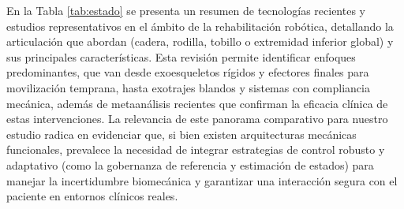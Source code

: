 \documentclass[a4paper,12pt]{article}
\begin{document}
En la Tabla \ref{tab:estado} se presenta un resumen de tecnologías recientes y estudios representativos en el ámbito de la rehabilitación robótica, detallando la articulación que abordan (cadera, rodilla, tobillo o extremidad inferior global) y sus principales características. Esta revisión permite identificar enfoques predominantes, que van desde exoesqueletos rígidos y efectores finales para movilización temprana, hasta exotrajes blandos y sistemas con compliancia mecánica, además de metaanálisis recientes que confirman la eficacia clínica de estas intervenciones. La relevancia de este panorama comparativo para nuestro estudio radica en evidenciar que, si bien existen arquitecturas mecánicas funcionales, prevalece la necesidad de integrar estrategias de control robusto y adaptativo (como la gobernanza de referencia y estimación de estados) para manejar la incertidumbre biomecánica y garantizar una interacción segura con el paciente en entornos clínicos reales.
\end{document}

